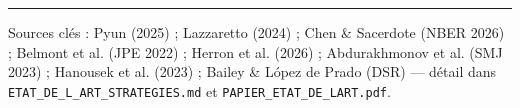 \documentclass[10pt,a4paper,twocolumn]{article}
\begin{document}
\vspace{4pt}
\hrule
\vspace{2pt}
{\footnotesize\color{gris} Sources clés : Pyun (2025) ; Lazzaretto (2024) ; Chen \& Sacerdote (NBER 2026) ; Belmont et al. (JPE 2022) ; Herron et al. (2026) ; Abdurakhmonov et al. (SMJ 2023) ; Hanousek et al. (2023) ; Bailey \& López de Prado (DSR) — détail dans \texttt{ETAT\_DE\_L\_ART\_STRATEGIES.md} et \texttt{PAPIER\_ETAT\_DE\_LART.pdf}.}
\end{document}
